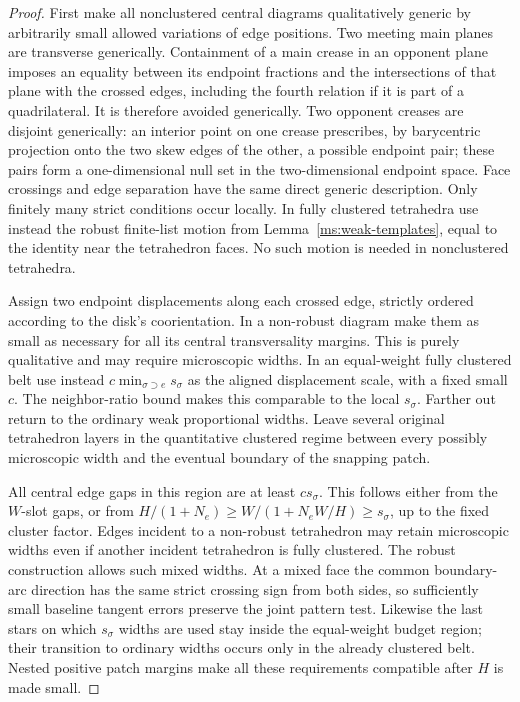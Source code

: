 \begin{proof}
First make all nonclustered central diagrams qualitatively generic
by arbitrarily small allowed variations of edge positions.  Two
meeting main planes are transverse generically.  Containment of a
main crease in an opponent plane imposes an equality between its
endpoint fractions and the intersections of that plane with the
crossed edges, including the fourth relation if it is part of a
quadrilateral.  It is therefore avoided generically.  Two opponent
creases are disjoint generically: an interior point on one crease
prescribes, by barycentric projection onto the two skew edges of
the other, a possible endpoint pair; these pairs form a
one-dimensional null set in the two-dimensional endpoint space.
Face crossings and edge separation have the same direct generic
description.  Only finitely many strict conditions occur locally.
In fully clustered tetrahedra use instead the robust finite-list
motion from Lemma~\ref{ms:weak-templates}, equal to the identity near the
tetrahedron faces.  No such motion is needed in nonclustered
tetrahedra.

Assign two endpoint displacements along each crossed edge,
strictly ordered according to the disk's coorientation.  In a
non-robust diagram make them as small as necessary for all its
central transversality margins.  This is purely qualitative and
may require microscopic widths.  In an equal-weight fully
clustered belt use instead $c\min_{\sigma\supset e}s_\sigma$ as
the aligned displacement scale, with a fixed small $c$.  The
neighbor-ratio bound makes this comparable to the local
$s_\sigma$.  Farther out return to the ordinary weak proportional
widths.  Leave several original tetrahedron layers in the
quantitative clustered regime between every possibly microscopic
width and the eventual boundary of the snapping patch.

All central edge gaps in this region are at least $c s_\sigma$.
This follows either from the $W$-slot gaps, or from
$H/(1+N_e)\ge W/(1+N_eW/H)\ge s_\sigma$, up to the fixed cluster
factor.  Edges incident to a non-robust tetrahedron may retain
microscopic widths even if another incident tetrahedron is fully
clustered.  The robust construction allows such mixed widths.
At a mixed face the common boundary-arc direction has the same
strict crossing sign from both sides, so sufficiently small
baseline tangent errors preserve the joint pattern test.
Likewise the last stars on which $s_\sigma$ widths are used stay
inside the equal-weight budget region; their transition to
ordinary widths occurs only in the already clustered belt.
Nested positive patch margins make all these requirements
compatible after $H$ is made small.


\end{proof}
